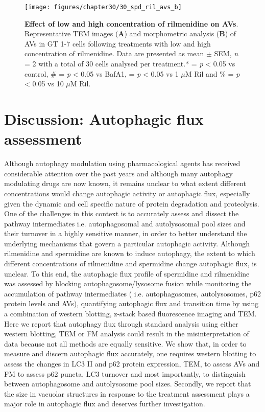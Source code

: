 {\begin{landscape}
\begin{figure}[!htbp]
\center
  \texttt{[image: figures/chapter30/30\_spd\_ril\_avs\_b]}
  \caption[Effect of low and high concentration of rilmenidine on AVs]{\textbf{Effect of low and high concentration of rilmenidine on AVs}. Representative TEM images (\textbf{A}) and morphometric analysis (\textbf{B}) of AVs in GT 1-7 cells following treatments with low and high concentration of rilmenidine. Data are presented as mean $\pm$ SEM, \textit{n} = 2 with a total of 30 cells analysed per treatment.* = \textit{p} < 0.05 vs control, \# = \textit{p} < 0.05 vs BafA1, \@ = \textit{p} < 0.05 vs 1 $\mu$M Ril and  \% = \textit{p} < 0.05 vs 10 $\mu$M Ril.}
  \label{fig:30_spd_ril_avs_a}
\end{figure} 
\end{landscape}

\section{Discussion: Autophagic flux assessment}

Although autophagy modulation using pharmacological agents has received considerable attention over the past years and although many autophagy modulating drugs are now known, it remains unclear to what extent different concentrations would change autophagic activity or autophagic flux, especially given the dynamic and cell specific nature of protein degradation and proteolysis. One of the challenges in this context is to accurately assess and dissect the pathway intermediates i.e. autophagosomal and autolysosomal pool sizes and their turnover in a highly sensitive manner, in order to better understand the underlying mechanisms that govern a particular autophagic activity. Although rilmenidine and spermidine are known to induce autophagy, the extent to which different concentrations of rilmenidine and spermidine  change  autophagic flux, is unclear. To this end, the autophagic flux profile of spermidine and rilmenidine was assessed by blocking autophagosome/lysosome fusion while monitoring the accumulation of pathway intermediates ( i.e. autophagosomes, autolysosomes, p62 protein levels and AVs), quantifying autophagic flux and transition time by using a combination of western blotting, z-stack based fluorescence imaging and TEM. Here we report that autophagy flux through standard analysis using either western blotting, TEM or FM analysis could result in the misinterpretation of data because not all methods are equally sensitive. We show that, in order to measure and discern autophagic flux accurately, one requires western blotting to assess the changes in LC3 II and p62 protein expression, TEM, to assess AVs and FM to assess p62 puncta, LC3 turnover and most importantly, to distinguish between autophagosome and autolysosome pool sizes. Secondly, we report that the size in vacuolar structures in response to the treatment assessment plays a major role in autophagic flux and deserves further investigation.

}
